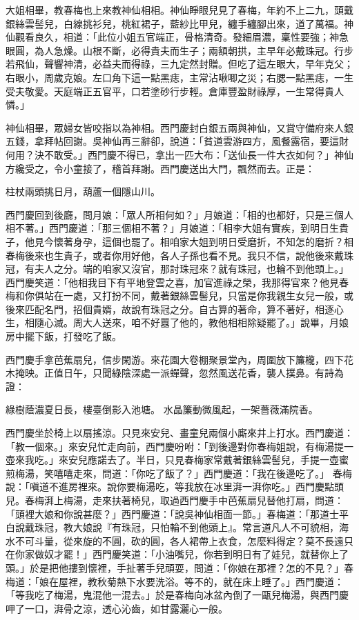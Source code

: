 大姐相畢，教春梅也上來教神仙相相。神仙睜眼兒見了春梅，年約不上二九，頭戴銀絲雲髻兒，白線挑衫兒，桃紅裙子，藍紗比甲兒，纏手纏腳出來，道了萬福。神仙觀看良久，相道：「此位小姐五官端正，骨格清奇。發細眉濃，稟性要強；神急眼圓，為人急燥。山根不斷，必得貴夫而生子；兩額朝拱，主早年必戴珠冠。行步若飛仙，聲響神清，必益夫而得祿，三九定然封贈。但吃了這左眼大，早年克父；右眼小，周歲克娘。左口角下這一點黑痣，主常沾啾唧之災；右腮一點黑痣，一生受夫敬愛。天庭端正五官平，口若塗砂行步輕。倉庫豐盈財祿厚，一生常得貴人憐。」

神仙相畢，眾婦女皆咬指以為神相。西門慶封白銀五兩與神仙，又賞守備府來人銀五錢，拿拜帖回謝。吳神仙再三辭卻，說道：「貧道雲游四方，風餐露宿，要這財何用？決不敢受。」西門慶不得已，拿出一匹大布：「送仙長一件大衣如何？」神仙方纔受之，令小童接了，稽首拜謝。西門慶送出大門，飄然而去。正是：

柱杖兩頭挑日月，葫蘆一個隱山川。

西門慶回到後廳，問月娘：「眾人所相何如？」月娘道：「相的也都好，只是三個人相不著。」西門慶道：「那三個相不著？」月娘道：「相李大姐有實疾，到明日生貴子，他見今懷著身孕，這個也罷了。相咱家大姐到明日受磨折，不知怎的磨折？相春梅後來也生貴子，或者你用好他，各人子孫也看不見。我只不信，說他後來戴珠冠，有夫人之分。端的咱家又沒官，那討珠冠來？就有珠冠，也輪不到他頭上。」西門慶笑道：「他相我目下有平地登雲之喜，加官進祿之榮，我那得官來？他見春梅和你俱站在一處，又打扮不同，戴著銀絲雲髻兒，只當是你我親生女兒一般，或後來匹配名門，招個貴婿，故說有珠冠之分。自古算的著命，算不著好，相逐心生，相隨心滅。周大人送來，咱不好囂了他的，教他相相除疑罷了。」說畢，月娘房中擺下飯，打發吃了飯。

西門慶手拿芭蕉扇兒，信步閑游。來花園大卷棚聚景堂內，周圍放下簾櫳，四下花木掩映。正值日午，只聞綠陰深處一派蟬聲，忽然風送花香，襲人撲鼻。有詩為證：

綠樹蔭濃夏日長，樓臺倒影入池塘。
水晶簾動微風起，一架薔薇滿院香。

西門慶坐於椅上以扇搖涼。只見來安兒、畫童兒兩個小廝來井上打水。西門慶道：「教一個來。」來安兒忙走向前，西門慶吩咐：「到後邊對你春梅姐說，有梅湯提一壺來我吃。」來安兒應諾去了。半日，只見春梅家常戴著銀絲雲髻兒，手提一壺蜜煎梅湯，笑嘻嘻走來，問道：「你吃了飯了？」西門慶道：「我在後邊吃了。」 春梅說：「嗔道不進房裡來。說你要梅湯吃，等我放在冰里湃一湃你吃。」西門慶點頭兒。春梅湃上梅湯，走來扶著椅兒，取過西門慶手中芭蕉扇兒替他打扇，問道：「頭裡大娘和你說甚麼？」西門慶道：「說吳神仙相面一節。」春梅道：「那道士平白說戴珠冠，教大娘說『有珠冠，只怕輪不到他頭上』。常言道凡人不可貌相，海水不可斗量，從來旋的不圓，砍的圓，各人裙帶上衣食，怎麼料得定？莫不長遠只在你家做奴才罷！」西門慶笑道：「小油嘴兒，你若到明日有了娃兒，就替你上了頭。」於是把他摟到懷裡，手扯著手兒頑耍，問道：「你娘在那裡？怎的不見？」春梅道：「娘在屋裡，教秋菊熱下水要洗浴。等不的，就在床上睡了。」西門慶道：「等我吃了梅湯，鬼混他一混去。」於是春梅向冰盆內倒了一甌兒梅湯，與西門慶呷了一口，湃骨之涼，透心沁齒，如甘露灑心一般。

